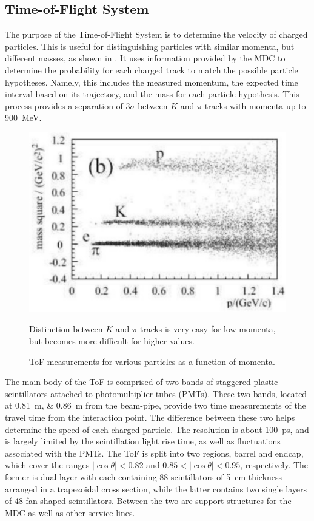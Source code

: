 \subsection{Time-of-Flight System}
\label{ssec:detector_tof}

The purpose of the Time-of-Flight System is to determine the velocity of charged particles.
This is useful for distinguishing particles with similar momenta, but different masses, as shown in .
It uses information provided by the MDC to determine the probability for each charged track to match the possible particle hypotheses.
Namely, this includes the measured momentum, the expected time interval based on its trajectory, and the mass for each particle hypothesis.
This process provides a separation of $3\sigma$ between $K$ and $\pi$ tracks with momenta up to \SI{900}{\MeV}.


\begin{figure}[H]
\centering
\includegraphics[scale=0.60]{figures/images/ToF.pdf}
\caption{ToF measurements for various particles as a function of momenta.}
{Distinction between $K$ and $\pi$ tracks is very easy for low momenta, but becomes more difficult for higher values.}
\label{fig:ToF}
\end{figure}

The main body of the ToF is comprised of two bands of staggered plastic scintillators attached to photomultiplier tubes (PMTs).
These two bands, located at \SIlist{0.81;0.86}{\m} from the beam-pipe, provide two time measurements of the travel time from the interaction point.
The difference between these two helps determine the speed of each charged particle.
The resolution is about \SI{100}{\ps}, and is largely limited by the scintillation light rise time, as well as fluctuations associated with the PMTs.
The ToF is split into two regions, barrel and endcap, which cover the ranges $|\cos\theta| < 0.82$ and $0.85 < |\cos\theta| < 0.95$, respectively.
The former is dual-layer with each containing 88 scintillators of \SI{5}{\cm} thickness arranged in a trapezoidal cross section, while the latter contains two single layers of 48 fan-shaped scintillators.
Between the two are support structures for the MDC as well as other service lines.


